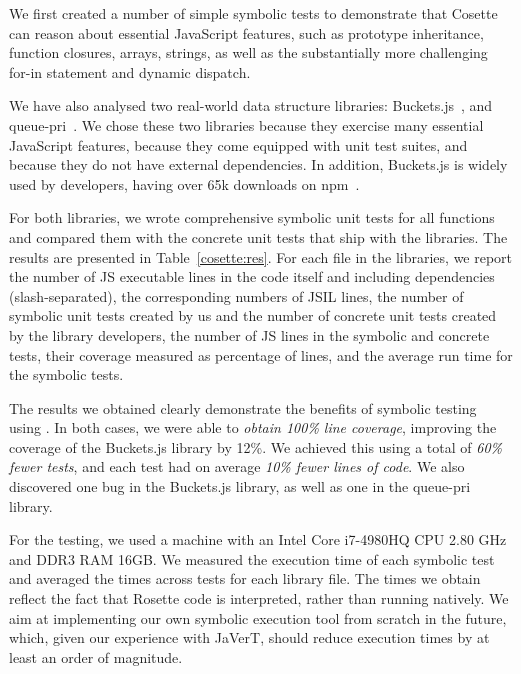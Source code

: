 We first created a number of simple symbolic tests to demonstrate that Cosette can reason about essential JavaScript features, such as prototype inheritance, function closures, arrays, strings, as well as the substantially more challenging for-in statement and dynamic dispatch. 

We have also analysed two real-world data structure libraries: Buckets.js~\cite{buckets}, and queue-pri~\cite{priq}.
We chose these two libraries because they exercise many essential JavaScript features, because they come equipped with unit test suites, and because they do not have external dependencies. In addition, Buckets.js is widely used by developers, having over 65k downloads on npm~\cite{npm}.

For both libraries, we wrote comprehensive symbolic unit tests for all functions and compared them with the concrete unit tests that ship with the libraries. The results are presented in Table~\ref{cosette:res}.
For each file in the libraries, we report the number of JS executable lines in the code itself and including dependencies (slash-separated), the corresponding numbers of JSIL lines, the number of symbolic unit tests created by us and the number of concrete unit tests created by the library developers, the number of JS lines in the symbolic and concrete tests, their coverage measured as percentage of lines, and the average \cosette run time for the symbolic tests.

The results we obtained clearly demonstrate the benefits of symbolic testing using \cosette.
In both cases, we were able to \emph{obtain 100\% line coverage}, improving the coverage of the Buckets.js library by 12\%.
We achieved this using a total of \emph{60\% fewer tests}, and each test had on average \emph{10\% fewer lines of code}.
We also discovered one bug in the Buckets.js library, as well as one in the queue-pri library. 


For the testing, we used a machine with an Intel Core i7-4980HQ CPU 2.80 GHz and DDR3 RAM 16GB. We measured the execution time of each symbolic test and averaged the times across tests for each library file. The times we obtain reflect the fact that Rosette code is interpreted, rather than running natively. We aim at implementing our own symbolic execution tool from scratch in the future, which, given our experience with JaVerT, should reduce execution times by at least an order of magnitude.

